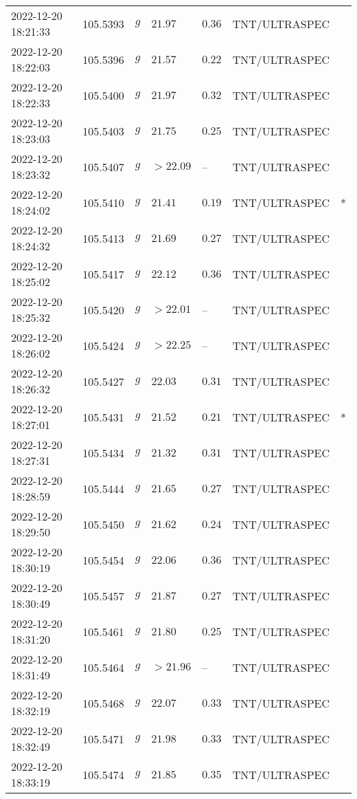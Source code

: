 \documentclass{nature_plusfigure}
\begin{document}
\begin{supplement}
\begin{center}
\begin{longtable}{lllllll}
2022-12-20 18:21:33 & 105.5393 & $g$ & $21.97$ & $0.36$ & TNT/ULTRASPEC &  \\ 
2022-12-20 18:22:03 & 105.5396 & $g$ & $21.57$ & $0.22$ & TNT/ULTRASPEC &  \\ 
2022-12-20 18:22:33 & 105.5400 & $g$ & $21.97$ & $0.32$ & TNT/ULTRASPEC &  \\ 
2022-12-20 18:23:03 & 105.5403 & $g$ & $21.75$ & $0.25$ & TNT/ULTRASPEC &  \\ 
2022-12-20 18:23:32 & 105.5407 & $g$ & $>22.09$ & -- & TNT/ULTRASPEC &  \\ 
2022-12-20 18:24:02 & 105.5410 & $g$ & $21.41$ & $0.19$ & TNT/ULTRASPEC & * \\ 
2022-12-20 18:24:32 & 105.5413 & $g$ & $21.69$ & $0.27$ & TNT/ULTRASPEC &  \\ 
2022-12-20 18:25:02 & 105.5417 & $g$ & $22.12$ & $0.36$ & TNT/ULTRASPEC &  \\ 
2022-12-20 18:25:32 & 105.5420 & $g$ & $>22.01$ & -- & TNT/ULTRASPEC &  \\ 
2022-12-20 18:26:02 & 105.5424 & $g$ & $>22.25$ & -- & TNT/ULTRASPEC &  \\ 
2022-12-20 18:26:32 & 105.5427 & $g$ & $22.03$ & $0.31$ & TNT/ULTRASPEC &  \\ 
2022-12-20 18:27:01 & 105.5431 & $g$ & $21.52$ & $0.21$ & TNT/ULTRASPEC & * \\ 
2022-12-20 18:27:31 & 105.5434 & $g$ & $21.32$ & $0.31$ & TNT/ULTRASPEC &  \\ 
2022-12-20 18:28:59 & 105.5444 & $g$ & $21.65$ & $0.27$ & TNT/ULTRASPEC &  \\ 
2022-12-20 18:29:50 & 105.5450 & $g$ & $21.62$ & $0.24$ & TNT/ULTRASPEC &  \\ 
2022-12-20 18:30:19 & 105.5454 & $g$ & $22.06$ & $0.36$ & TNT/ULTRASPEC &  \\ 
2022-12-20 18:30:49 & 105.5457 & $g$ & $21.87$ & $0.27$ & TNT/ULTRASPEC &  \\ 
2022-12-20 18:31:20 & 105.5461 & $g$ & $21.80$ & $0.25$ & TNT/ULTRASPEC &  \\ 
2022-12-20 18:31:49 & 105.5464 & $g$ & $>21.96$ & -- & TNT/ULTRASPEC &  \\ 
2022-12-20 18:32:19 & 105.5468 & $g$ & $22.07$ & $0.33$ & TNT/ULTRASPEC &  \\ 
2022-12-20 18:32:49 & 105.5471 & $g$ & $21.98$ & $0.33$ & TNT/ULTRASPEC &  \\ 
2022-12-20 18:33:19 & 105.5474 & $g$ & $21.85$ & $0.35$ & TNT/ULTRASPEC &  \\ 

\end{longtable}
\end{center}
\end{supplement}
\end{document}
